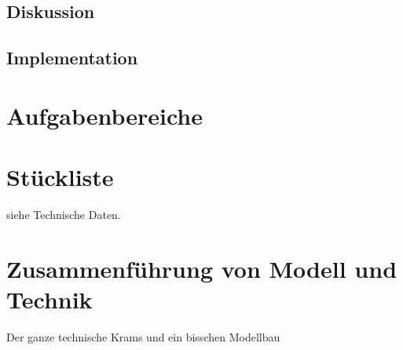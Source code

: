     \subsection{Diskussion}

    \subsection{Implementation} 

    \section{Aufgabenbereiche}


\section{Stückliste}
    siehe Technische Daten.

\section{Zusammenführung von Modell und Technik}
    Der ganze technische Krams und ein bisschen Modellbau
